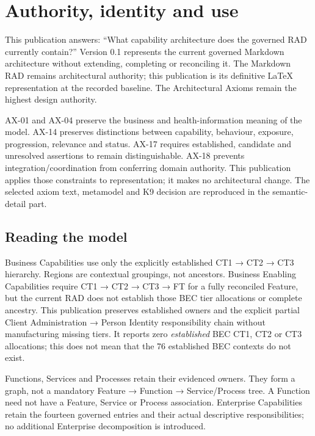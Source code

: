 \chapter{Authority, identity and use}\label{guide}

This publication answers: ``What capability architecture does the governed RAD currently contain?''
Version 0.1 represents the current governed Markdown architecture without extending,
completing or reconciling it. The Markdown RAD remains architectural authority;
this publication is its definitive LaTeX representation at the recorded baseline.
The Architectural Axioms remain the highest design authority.

AX-01 and AX-04 preserve the business and health-information meaning of the model.
AX-14 preserves distinctions between capability, behaviour, exposure, progression,
relevance and status. AX-17 requires established, candidate and unresolved assertions
to remain distinguishable. AX-18 prevents integration/coordination from conferring
domain authority. This publication applies those constraints to representation;
it makes no architectural change. The selected axiom text, metamodel and K9
decision are reproduced in the semantic-detail part.

\section{Reading the model}

Business Capabilities use only the explicitly established CT1 → CT2 → CT3
hierarchy. Regions are contextual groupings, not ancestors. Business Enabling
Capabilities require CT1 → CT2 → CT3 → FT for a fully reconciled Feature, but the
current RAD does not establish those BEC tier allocations or complete ancestry.
This publication preserves established owners and the explicit partial
Client Administration → Person Identity responsibility chain without manufacturing
missing tiers. It reports zero \emph{established} BEC CT1, CT2 or CT3 allocations;
this does not mean that the 76 established BEC contexts do not exist.

Functions, Services and Processes retain their evidenced owners. They form a graph,
not a mandatory Feature → Function → Service/Process tree. A Function need not
have a Feature, Service or Process association. Enterprise Capabilities retain the
fourteen governed entries and their actual descriptive responsibilities; no additional
Enterprise decomposition is introduced.

